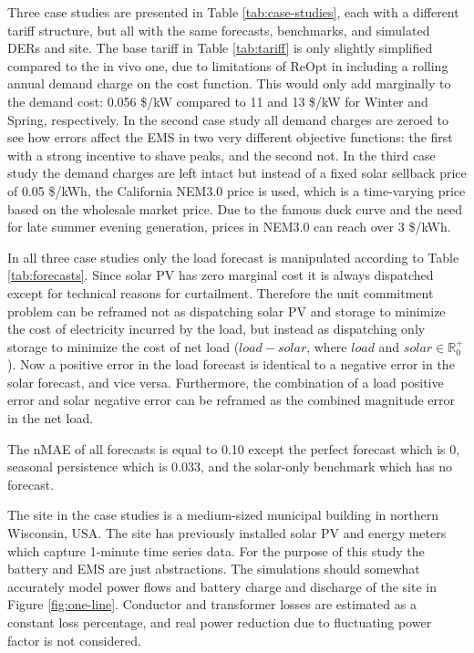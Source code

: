 \documentclass[conference]{IEEEtran}
\begin{document}
Three case studies are presented in Table \ref{tab:case-studies}, each with a different tariff structure, but all with the same forecasts, benchmarks, and simulated DERs and site. The base tariff in Table \ref{tab:tariff} is only slightly simplified compared to the in vivo one, due to limitations of ReOpt in including a rolling annual demand charge on the cost function. This would only add marginally to the demand cost: 0.056 \$/kW compared to 11 and 13 \$/kW for Winter and Spring, respectively. In the second case study all demand charges are zeroed to see how errors affect the EMS in two very different objective functions: the first with a strong incentive to shave peaks, and the second not. In the third case study the demand charges are left intact but instead of a fixed solar sellback price of 0.05 \$/kWh, the California NEM3.0 price is used, which is a time-varying price based on the wholesale market price. Due to the famous duck curve and the need for late summer evening generation, prices in NEM3.0 can reach over 3 \$/kWh.

In all three case studies only the load forecast is manipulated according to Table \ref{tab:forecasts}. Since solar PV has zero marginal cost it is always dispatched except for technical reasons for curtailment. Therefore the unit commitment problem can be reframed not as dispatching solar PV and storage to minimize the cost of electricity incurred by the load, but instead as dispatching only storage to minimize the cost of net load ($load - solar$, where $load$ and $solar \in \mathbb{R}_0^+$). Now a positive error in the load forecast is identical to a negative error in the solar forecast, and vice versa. Furthermore, the combination of a load positive error and solar negative error can be reframed as the combined magnitude error in the net load.  

The nMAE of all forecasts is equal to 0.10 except the perfect forecast which is 0, seasonal persistence which is 0.033, and the solar-only benchmark which has no forecast.

The site in the case studies is a medium-sized municipal building in northern Wisconsin, USA. The site has previously installed solar PV and energy meters which capture 1-minute time series data. For the purpose of this study the battery and EMS are just abstractions. The simulations should somewhat accurately model power flows and battery charge and discharge of the site in Figure \ref{fig:one-line}. Conductor and transformer losses are estimated as a constant loss percentage, and real power reduction due to fluctuating power factor is not considered. 
\end{document}
